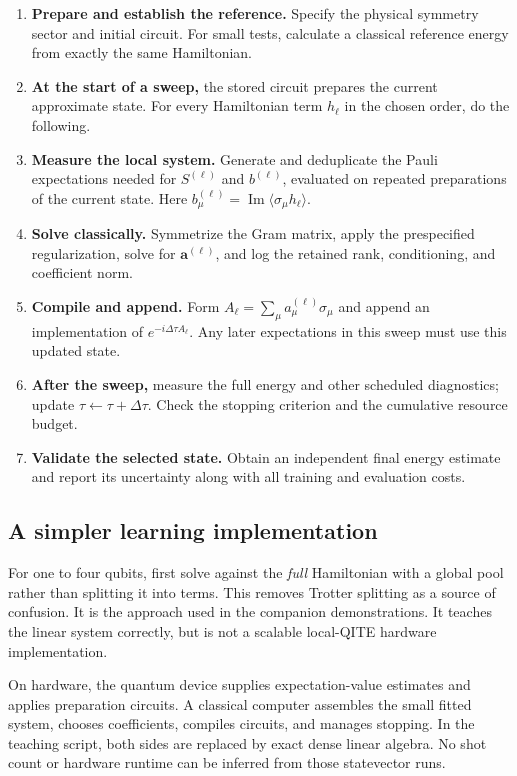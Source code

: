 \documentclass[11pt,a4paper]{article}
\newcommand{\ex}[1]{\langle #1\rangle}
\newcommand{\Ima}{\operatorname{Im}}
\newcommand{\dt}{\Delta\tau}
\begin{document}
\begin{enumerate}
\item \textbf{Prepare and establish the reference.} Specify the physical symmetry sector and initial circuit. For small tests, calculate a classical reference energy from exactly the same Hamiltonian.
\item \textbf{At the start of a sweep,} the stored circuit prepares the current approximate state. For every Hamiltonian term $h_\ell$ in the chosen order, do the following.
\item \textbf{Measure the local system.} Generate and deduplicate the Pauli expectations needed for $S^{(\ell)}$ and $b^{(\ell)}$, evaluated on repeated preparations of the current state. Here $b_\mu^{(\ell)}=\Ima\ex{\sigma_\mu h_\ell}$.
\item \textbf{Solve classically.} Symmetrize the Gram matrix, apply the prespecified regularization, solve for $\bm a^{(\ell)}$, and log the retained rank, conditioning, and coefficient norm.
\item \textbf{Compile and append.} Form $A_\ell=\sum_\mu a_\mu^{(\ell)}\sigma_\mu$ and append an implementation of $e^{-i\dt A_\ell}$. Any later expectations in this sweep must use this updated state.
\item \textbf{After the sweep,} measure the full energy and other scheduled diagnostics; update $\tau\leftarrow\tau+\dt$. Check the stopping criterion and the cumulative resource budget.
\item \textbf{Validate the selected state.} Obtain an independent final energy estimate and report its uncertainty along with all training and evaluation costs.
\end{enumerate}

\subsection*{A simpler learning implementation}
For one to four qubits, first solve against the \emph{full} Hamiltonian with a global pool rather than splitting it into terms. This removes Trotter splitting as a source of confusion. It is the approach used in the companion demonstrations. It teaches the linear system correctly, but is not a scalable local-QITE hardware implementation.

\begin{caution}
On hardware, the quantum device supplies expectation-value estimates and applies preparation circuits. A classical computer assembles the small fitted system, chooses coefficients, compiles circuits, and manages stopping. In the teaching script, both sides are replaced by exact dense linear algebra. No shot count or hardware runtime can be inferred from those statevector runs.
\end{caution}
\end{document}

